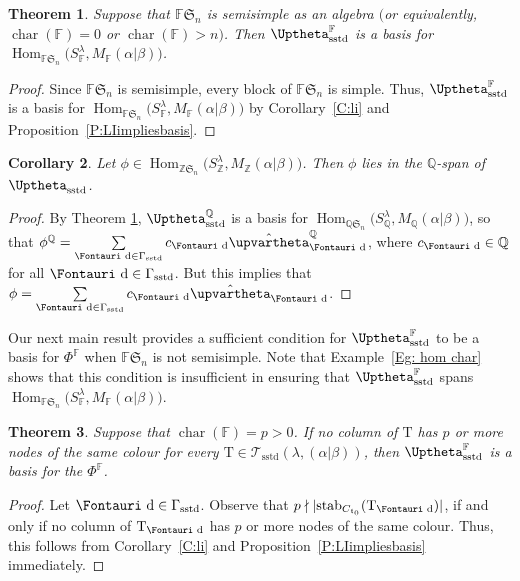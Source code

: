 \documentclass[pdftex]{sigma}
\newtheorem{Theorem}{Theorem}[section]
\newtheorem{Corollary}[Theorem]{Corollary}
\renewcommand{\t}{\mathfrak{t}}
\newcommand{\TTS}{\mathscr{T}_\mathrm{sstd}}
\newcommand{\T}{\mathrm{T}}
\newcommand{\Char}{\operatorname{\mathrm{char}}}
\newcommand{\Hom}{\operatorname{Hom}}
\newcommand{\sym}[1]{\mathfrak{S}_{#1}}
\newcommand{\F}{\mathbb{F}}
\newcommand{\dR}{\text{\Fontauri d}}
\newcommand{\Z}{\mathbb{Z}}
\newcommand{\Q}{\mathbb{Q}}
\newcommand{\Jhom}{\upvartheta}
\newcommand{\hJhom}{\hat{\Jhom}}
\newcommand{\JHOM}{\Uptheta}
\newcommand{\hJHOM}{{\JHOM}}
\begin{document}
\begin{Theorem} \label{T:ssbasis}Suppose that $\F\sym{n}$ is semisimple as an algebra $($or equivalently, $\Char(\F) = 0$ or $\Char(\F)>n)$. Then $\hJHOM_{\mathrm{sstd}}^{\F}$ is a basis for $\Hom _{\F \sym{n}}\big(S_\F^{\lambda}, M_\F(\alpha|\beta)\big)$.
\end{Theorem}

\begin{proof}Since $\F \sym{n}$ is semisimple, every block of $\F\sym{n}$ is simple. Thus, $\hJHOM_{\mathrm{sstd}}^{\F}$ is a basis for $\Hom _{\F \sym{n}}\big(S_\F^{\lambda}, M_\F(\alpha|\beta)\big)$ by Corollary~\ref{C:li} and Proposition~\ref{P:LIimpliesbasis}.
\end{proof}

\begin{Corollary}
Let $\phi \in \Hom_{\Z\sym{n}}\big(S^{\lambda}_{\Z}, M_{\Z}(\alpha|\beta)\big)$. Then $\phi$ lies in the $\mathbb{Q}$-span of $\hJHOM_{\mathrm{sstd}}$.
\end{Corollary}

\begin{proof}
By Theorem \ref{T:ssbasis}, $\hJHOM_{\mathrm{sstd}}^{\mathbb{Q}}$ is a basis for $\Hom _{\mathbb{Q} \sym{n}}\big(S_\Q^{\lambda}, M_\Q(\alpha|\beta)\big)$, so that $\phi^{\Q} = \sum\limits_{\dR \in \Gamma_{\mathrm{sstd}}} c_{\dR} \hJhom^{\Q}_{\dR}$, where $c_{\dR} \in \mathbb{Q}$ for all $\dR \in \Gamma_{\mathrm{sstd}}$. But this implies that $\phi = \sum\limits_{\dR \in \Gamma_{\mathrm{sstd}}} c_{\dR} \hJhom_{\dR}$.
\end{proof}

Our next main result provides a sufficient condition for $\hJHOM_{\mathrm{sstd}}^{\F}$ to be a basis for $\Phi^{\F}$ when $\F\sym{n}$ is not semisimple. Note that Example~\ref{Eg: hom char} shows that this condition is insufficient in ensuring that $\hJHOM^{\F}_{\mathrm{sstd}}$ spans $\Hom_{\F\sym{n}}\big(S_{\F}^{\lambda}, M_{\F}(\alpha|\beta)\big)$.

\begin{Theorem} \label{T:3}
Suppose that $\Char(\F) = p >0$. If no column of $\T$ has $p$ or more nodes of the same colour for every $\T \in \TTS(\lambda, (\alpha|\beta))$, then $\hJHOM_{\mathrm{sstd}}^{\F}$ is a basis for the $\Phi^{\F}$.
\end{Theorem}

\begin{proof}Let $\dR \in \Gamma_{\mathrm{sstd}}$. Observe that $p \nmid |\mathrm{stab}_{C_{\t_0}}(\T_\dR)|$, if and only if no column of $\T_\dR$ has $p$ or more nodes of the same colour. Thus, this follows from Corollary~\ref{C:li} and Proposition~\ref{P:LIimpliesbasis} immediately.
\end{proof}
\end{document}
